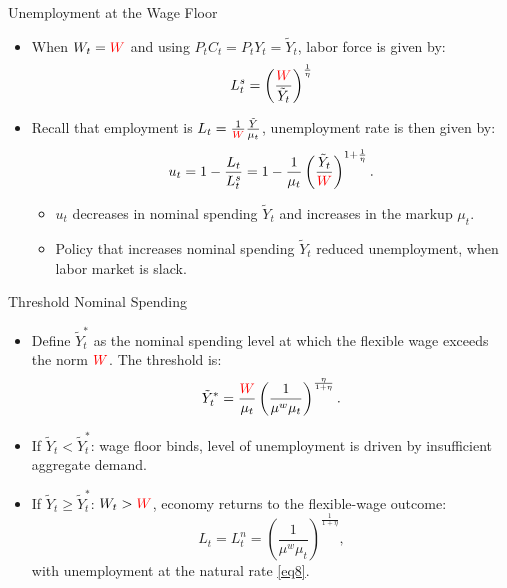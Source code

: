 \documentclass[11pt,aspectratio=169]{beamer}
\begin{document}
\begin{frame}{Unemployment at the Wage Floor}
\begin{itemize}
    \item When $W_t = \textcolor{red}{W}$ and using $P_tC_t=P_tY_t = \tilde{Y}_t$, labor force is given by: 
    \begin{align*}
        L_t^s=\left(\frac{\textcolor{red}{W}}{\tilde{Y}_t}\right)^{\frac{1}{\eta}}
    \end{align*}
    \item Recall that employment is $L_t = \frac{1}{\textcolor{red}{W}}\frac{\tilde{Y}}{\mu_t}$, unemployment rate is then given by: 
    \begin{align*}
        u_t=1-\frac{L_t}{L_t^s}
=1-\frac{1}{\mu_t}\left(\frac{\tilde{Y}_t}{\textcolor{red}{W}}\right)^{1+\frac{1}{\eta}}.
    \end{align*}
    \begin{itemize}
        \item $u_t$ decreases in nominal spending $\tilde{Y}_t$ and increases in the markup $\mu_t$.
        \item Policy that increases nominal spending $\tilde{Y}_t$ reduced unemployment, when labor market is slack.
    \end{itemize}
\end{itemize}
\end{frame}

\begin{frame}{Threshold Nominal Spending}
\begin{itemize}
    \item Define $\tilde{Y}_t^\ast$ as the nominal spending level at which the flexible wage exceeds the norm $\textcolor{red}{W}$. The threshold is:
    \begin{align*}
        \tilde{Y}_{t}^{\ast }=\frac{\textcolor{red}{W}}{\mu _{t}}\left( \frac{1}{\mu ^{w}\mu _{t}}\right) ^{\frac{\eta }{1+\eta }}.
    \end{align*}
  \item If $\tilde{Y}_t<\tilde{Y}_t^\ast$: wage floor binds, level of unemployment is driven by insufficient aggregate demand. 
  \item If $\tilde{Y}_t\ge\tilde{Y}_t^\ast$: $W_t>\textcolor{red}{W}$, economy returns to the flexible-wage outcome:
  \[
  L_t=L_t^n=\left(\frac{1}{\mu^w\mu_t}\right)^{\frac{1}{1+\eta}},
  \]
  with unemployment at the natural rate \eqref{eq8}.
\end{itemize}
\end{frame}
\end{document}
